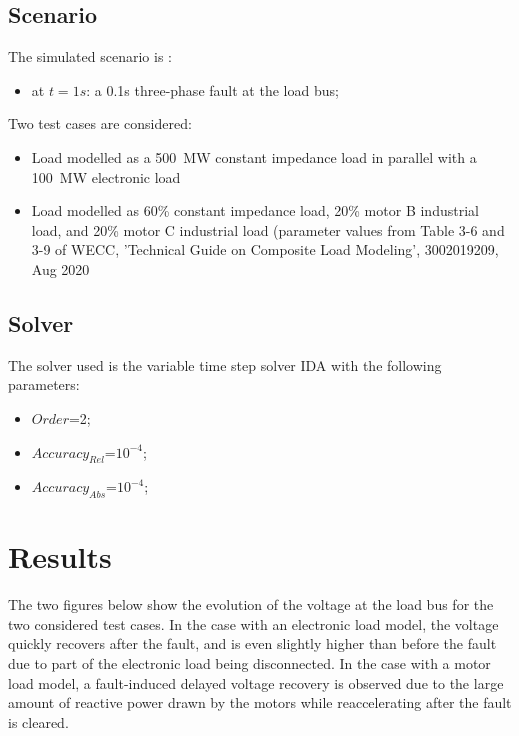 \documentclass[a4paper, 12pt]{report}
\begin{document}
\subsection{Scenario}
The simulated scenario is :
\begin{itemize}
\item at $t=1s$: a 0.1s three-phase fault at the load bus;
\end{itemize}

Two test cases are considered:
\begin{itemize}
\item Load modelled as a 500~MW constant impedance load in parallel with a 100~MW electronic load
\item Load modelled as 60\% constant impedance load, 20\% motor B industrial load, and 20\% motor C industrial load (parameter values from Table 3-6 and 3-9 of WECC, 'Technical Guide on Composite Load Modeling', 3002019209, Aug 2020
\end{itemize}

\subsection{Solver}
The solver used is the variable time step solver IDA with the following parameters:
\begin{itemize}
\item $Order$=2;
\item $Accuracy_{Rel}$=$10^{-4}$;
\item $Accuracy_{Abs}$=$10^{-4}$;
\end{itemize}

\newpage
\section{Results}

The two figures below show the evolution of the voltage at the load bus for the two considered test cases. In the case with an electronic load model, the voltage quickly recovers after the fault, and is even slightly higher than before the fault due to part of the electronic load being disconnected. In the case with a motor load model, a fault-induced delayed voltage recovery is observed due to the large amount of reactive power drawn by the motors while reaccelerating after the fault is cleared.
\end{document}
